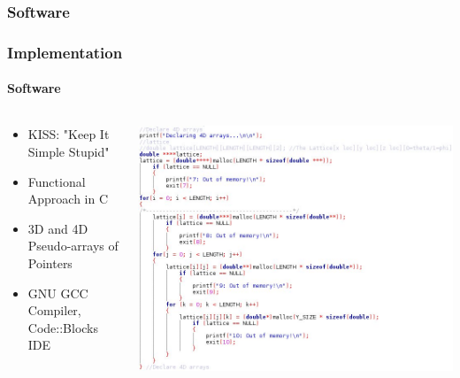 \documentclass{beamer}
\begin{document}
	\subsubsection*{Software}
  \begin{frame}
    \frametitle{Implementation}
    \framesubtitle{Software}
    \begin{columns}[t]
    	\begin{column}[T]{5cm}
    		\begin{itemize}
    			\item KISS: "Keep It Simple Stupid"
    			\item Functional Approach in C
    			\item 3D and 4D Pseudo-arrays of Pointers
    			\item GNU GCC Compiler, Code::Blocks IDE
   			\end{itemize}
      \end{column}
    	\begin{column}[T]{6.5cm}
    		\includegraphics[scale=0.35]{code1}
    	\end{column}
    \end{columns}
  \end{frame}
\end{document}
